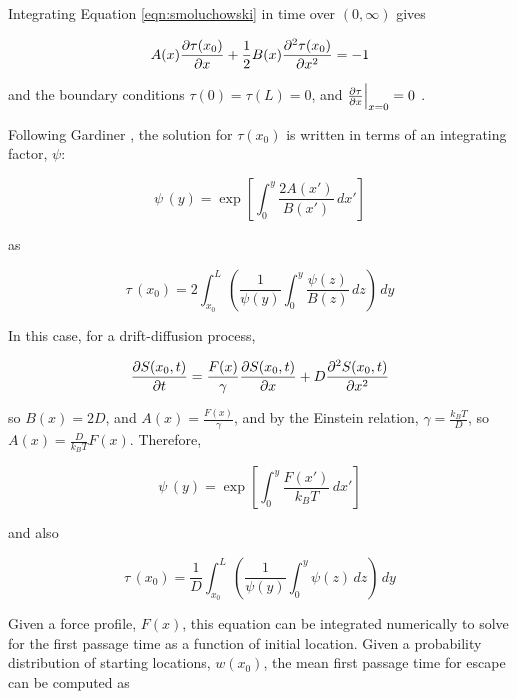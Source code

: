 Integrating Equation \ref{eqn:smoluchowski} in time over $(0,\infty)$ gives

\begin{equation}
A(x) \frac{\partial \tau (x_0)}{\partial x} + \frac{1}{2} B(x) \frac{\partial^2 \tau (x_0)}{\partial x^2} = -1
\label{eqn:first_passage}
\end{equation}

\noindent
and the boundary conditions $\tau(0)=\tau(L)=0$, and $\frac{\partial \tau}{\partial x} \Bigr|_{x=0} =0$ .

Following Gardiner \citep{Gardiner1985}, the solution for $\tau (x_0)$ is written in terms of an integrating factor, $\psi$:

\begin{equation}
\psi \, (y) = \exp \left [ \int_0^y \frac{2A(x')}{B(x')} \,dx' \right ]
\label{eqn:psi}
\end{equation}

\noindent
as

\begin{equation}
\tau \, (x_0) = 2 \int_{x_0}^{L} \left ( \frac{1}{\psi(y)} \int_{0}^{y} \frac{\psi(z)}{B(z)} \,dz \right ) \,dy
\label{eqn:first_passage_sol}
\end{equation}

In this case, for a drift-diffusion process,

\begin{equation}
\frac{\partial S(x_0,t)}{\partial t} = \frac{F(x)}{\gamma} \frac{\partial S(x_0,t)}{\partial x} + D \frac{\partial^2 S(x_0,t)}{\partial x^2}
\label{eqn:smoluchowski_final}
\end{equation}

\noindent
so $B(x) = 2D$, and $A(x) = \frac{F(x)}{\gamma}$, and by the Einstein relation, $\gamma = \frac{k_B T}{D}$, so $A(x) = \frac{D}{k_B T} F(x)$.  Therefore,

\begin{equation}
\psi \, (y) = \exp \left [ \int_0^y  \frac{F(x')}{k_B T} \,dx' \right ]
\label{eqn:psi2}
\end{equation}

and also

\begin{equation}
\tau \, (x_0) = \frac{1}{D} \int_{x_0}^{L} \left ( \frac{1}{\psi(y)} \int_{0}^{y} \psi(z) \,dz \right ) \,dy
\label{eqn:first_passage_sol}
\end{equation}

Given a force profile, $F(x)$, this equation can be integrated numerically to solve for the first passage time as a function of initial location.  Given a probability distribution of starting locations, $w(x_0)$, the mean first passage time for escape can be computed as

